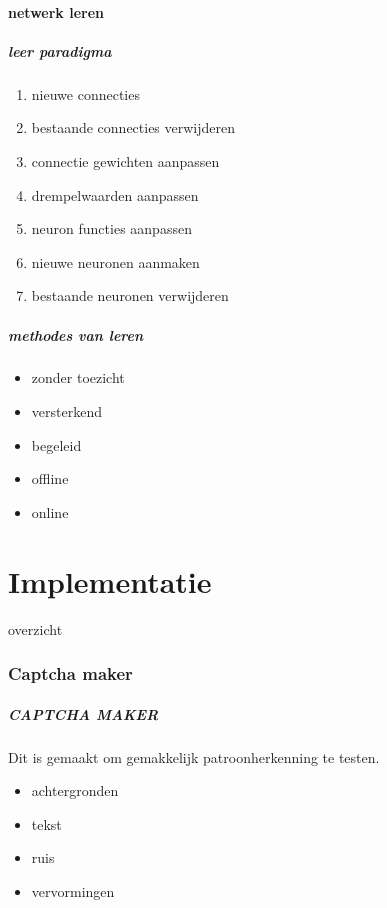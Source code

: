\documentclass{beamer}
\newcommand{\partTOC}{%
  \begin{frame}{overzicht}%
  \tableofcontents[currentpart]%
  \end{frame}%
}
\begin{document}
\subsection{netwerk leren}
\begin{frame}
  \frametitle{leer paradigma}
  \begin{enumerate}
    \item nieuwe connecties
    \item bestaande connecties verwijderen
    \item connectie gewichten aanpassen
    \item drempelwaarden aanpassen
    \item neuron functies aanpassen
    \item nieuwe neuronen aanmaken
    \item bestaande neuronen verwijderen
  \end{enumerate}
\end{frame}
\begin{frame}
  \frametitle{methodes van leren}
  \begin{itemize}
    \item zonder toezicht
    \item versterkend
    \item begeleid
  \end{itemize}
  \vfill
  \begin{itemize}
    \item offline
    \item online
  \end{itemize}
\end{frame}
\part{Implementatie}
\partTOC
\section{Captcha maker}
\begin{frame}
  \frametitle{CAPTCHA MAKER}
  Dit is gemaakt om gemakkelijk patroonherkenning te testen.
  \begin{itemize}
    \item achtergronden
    \item tekst
    \item ruis
    \item vervormingen
  \end{itemize}
\end{frame}
\end{document}
